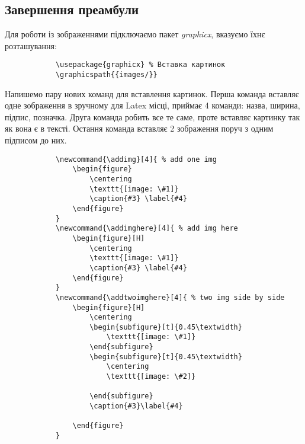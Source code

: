 \subsection{Завершення преамбули}

Для роботи із зображеннями підключаємо пакет \textit{graphicx}, вказуємо їхнє розташування:

\begin{lstlisting}
			\usepackage{graphicx} % Вставка картинок 
			\graphicspath{{images/}}
\end{lstlisting}

Напишемо пару нових команд для вставлення картинок. Перша команда вставляє одне зображення в зручному для Latex місці, приймає 4 команди: назва, ширина, підпис, позначка. Друга команда робить все те саме, проте вставляє картинку так як вона є в тексті. Остання команда вставляє 2 зображення поруч з одним підписом до них.

\begin{lstlisting}
			\newcommand{\addimg}[4]{ % add one img
				\begin{figure}
					\centering
					\texttt{[image: \#1]}
					\caption{#3} \label{#4}
				\end{figure}
			}
			\newcommand{\addimghere}[4]{ % add img here
				\begin{figure}[H]
					\centering
					\texttt{[image: \#1]}
					\caption{#3} \label{#4}
				\end{figure}
			}
			\newcommand{\addtwoimghere}[4]{ % two img side by side
				\begin{figure}[H]
					\centering
					\begin{subfigure}[t]{0.45\textwidth}
						\texttt{[image: \#1]}
					\end{subfigure}
					\begin{subfigure}[t]{0.45\textwidth}
						\centering
						\texttt{[image: \#2]}
						
					\end{subfigure}
					\caption{#3}\label{#4}
				
				\end{figure}
			}
\end{lstlisting}

